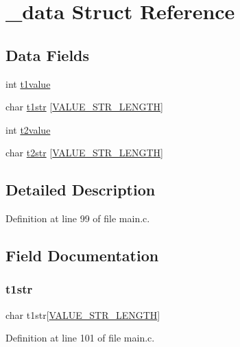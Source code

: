 \hypertarget{struct__data}{}\section{\+\_\+data Struct Reference}
\label{struct__data}
\subsection*{Data Fields}
\begin{DoxyCompactItemize}
\item 
int \hyperlink{struct__data_ae42a6c28c48b336eb8346a7a749a1764}{t1value}
\item 
char \hyperlink{struct__data_ab01e6e87aec4a7faefa9a99faa822b96}{t1str} \mbox{[}\hyperlink{main_8c_a0ce73b7419565289cf9636d1d986c348}{V\+A\+L\+U\+E\+\_\+\+S\+T\+R\+\_\+\+L\+E\+N\+G\+TH}\mbox{]}
\item 
int \hyperlink{struct__data_a31041380c5820f78ea7aacb0f221bcc8}{t2value}
\item 
char \hyperlink{struct__data_a516d3e35b1f6f0597c1f4ce7da4bd7f5}{t2str} \mbox{[}\hyperlink{main_8c_a0ce73b7419565289cf9636d1d986c348}{V\+A\+L\+U\+E\+\_\+\+S\+T\+R\+\_\+\+L\+E\+N\+G\+TH}\mbox{]}
\end{DoxyCompactItemize}


\subsection{Detailed Description}


Definition at line 99 of file main.\+c.



\subsection{Field Documentation}
\mbox{\label{struct__data_ab01e6e87aec4a7faefa9a99faa822b96}} 
\subsubsection{\texorpdfstring{t1str}{t1str}}
{\footnotesize\ttfamily char t1str\mbox{[}\hyperlink{main_8c_a0ce73b7419565289cf9636d1d986c348}{V\+A\+L\+U\+E\+\_\+\+S\+T\+R\+\_\+\+L\+E\+N\+G\+TH}\mbox{]}}



Definition at line 101 of file main.\+c.

